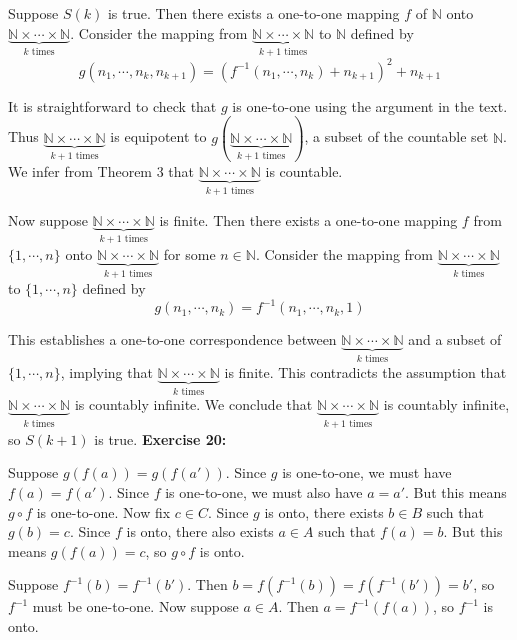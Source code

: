 Suppose $S(k)$ is true. Then there exists a one-to-one mapping $f$ of $\mathbb{N}$ onto $\underbrace{\mathbb{N} \times \cdots \times \mathbb{N}}_{k \text{ times}}$. Consider the mapping from $\underbrace{\mathbb{N} \times \cdots \times \mathbb{N}}_{k+1 \text{ times}}$ to $\mathbb{N}$ defined by
\[ g(n_1, \cdots, n_k, n_{k+1}) = (f^{-1}(n_1, \cdots, n_k) + n_{k+1})^2 + n_{k+1} \]

It is straightforward to check that $g$ is one-to-one using the argument in the text. Thus $\underbrace{\mathbb{N} \times \cdots \times \mathbb{N}}_{k+1 \text{ times}}$ is equipotent to $g(\underbrace{\mathbb{N} \times \cdots \times \mathbb{N}}_{k+1 \text{ times}})$, a subset of the countable set $\mathbb{N}$. We infer from Theorem 3 that $\underbrace{\mathbb{N} \times \cdots \times \mathbb{N}}_{k+1 \text{ times}}$ is countable.

Now suppose $\underbrace{\mathbb{N} \times \cdots \times \mathbb{N}}_{k+1 \text{ times}}$ is finite. Then there exists a one-to-one mapping $f$ from $\{1, \cdots, n\}$ onto $\underbrace{\mathbb{N} \times \cdots \times \mathbb{N}}_{k+1 \text{ times}}$ for some $n \in \mathbb{N}$. Consider the mapping from $\underbrace{\mathbb{N} \times \cdots \times \mathbb{N}}_{k \text{ times}}$ to $\{1, \cdots, n\}$ defined by
\[ g(n_1, \cdots, n_k) = f^{-1}(n_1, \cdots, n_k, 1) \]

This establishes a one-to-one correspondence between $\underbrace{\mathbb{N} \times \cdots \times \mathbb{N}}_{k \text{ times}}$ and a subset of $\{1, \cdots, n\}$, implying that $\underbrace{\mathbb{N} \times \cdots \times \mathbb{N}}_{k \text{ times}}$ is finite. This contradicts the assumption that $\underbrace{\mathbb{N} \times \cdots \times \mathbb{N}}_{k \text{ times}}$ is countably infinite. We conclude that $\underbrace{\mathbb{N} \times \cdots \times \mathbb{N}}_{k+1 \text{ times}}$ is countably infinite, so $S(k+1)$ is true.
\textbf{Exercise 20:}

Suppose $g(f(a)) = g(f(a'))$. Since $g$ is one-to-one, we must have $f(a) = f(a')$. Since $f$ is one-to-one, we must also have $a = a'$. But this means $g \circ f$ is one-to-one. Now fix $c \in C$. Since $g$ is onto, there exists $b \in B$ such that $g(b) = c$. Since $f$ is onto, there also exists $a \in A$ such that $f(a) = b$. But this means $g(f(a)) = c$, so $g \circ f$ is onto.

Suppose $f^{-1}(b) = f^{-1}(b')$. Then $b = f(f^{-1}(b)) = f(f^{-1}(b')) = b'$, so $f^{-1}$ must be one-to-one. Now suppose $a \in A$. Then $a = f^{-1}(f(a))$, so $f^{-1}$ is onto.

